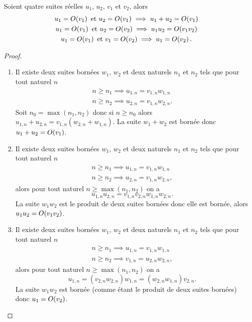 \begin{prop}
  Soient quatre suites réelles \(u_1\), \(u_2\), \(v_1\) et \(v_2\), alors
  \begin{gather}
  u_1 = O\mathopen{}\left(v_1\right) \text{~et~} u_2 = O\mathopen{}\left(v_1\right) \implies u_1+u_2 = O\mathopen{}\left(v_1\right)\\
  u_1 = O\mathopen{}\left(v_1\right) \text{~et~} u_2 = O\mathopen{}\left(v_2\right) \implies u_1u_2 = O\mathopen{}\left(v_1 v_2\right)\\
  u_1 = O\mathopen{}\left(v_1\right) \text{~et~} v_1 = O\mathopen{}\left(v_2\right) \implies u_1 = O\mathopen{}\left(v_2\right).
  \end{gather}
\end{prop}
\begin{proof}
  \begin{enumerate}
  \item Il existe deux suites bornées \(w_1\), \(w_2\) et deux naturels \(n_1\) et \(n_2\) tels que pour tout naturel \(n\)
    \begin{align}
      n \geqslant n_1 \implies u_{1,n} = v_{1,n}w_{1,n} \\
      n \geqslant n_2 \implies u_{2,n} = v_{1,n}w_{2,n}.
    \end{align}
    Soit \(n_0 = \max(n_1,n_2)\) donc si \(n \geqslant n_0\) alors \(u_{1,n} + u_{2,n}= v_{1,n} (w_{2,n}+w_{1,n})\). La suite \(w_{1} + w_{2}\) est bornée donc \(u_1+u_2 = O\mathopen{}\left(v_1\right)\).
  \item Il existe deux suites bornées \(w_1\), \(w_2\) et deux naturels \(n_1\) et \(n_2\) tels que pour tout naturel \(n\)
    \begin{align}
      n \geqslant n_1 \implies u_{1,n} = v_{1,n}w_{1,n} \\
      n \geqslant n_2 \implies u_{2,n} = v_{1,n}w_{2,n},
    \end{align}
    alors pour tout naturel \(n \geqslant \max(n_1,n_2)\) on a
    \begin{equation}
      u_{1,n} u_{2,n} = v_{1,n} v_{2,n} w_{1,n} w_{2,n}.
    \end{equation}
    La suite \(w_1 w_2\) est le produit de deux suites bornées donc elle est bornée, alors \(u_1u_2 = O\mathopen{}\left(v_1v_2\right)\).
  \item Il existe deux suites bornées \(w_1\), \(w_2\) et deux naturels \(n_1\) et \(n_2\) tels que pour tout naturel \(n\) 
    \begin{align}
      n \geqslant n_1 \implies u_{1,n} = v_{1,n}w_{1,n} \\
      n \geqslant n_2 \implies v_{1,n} = u_{2,n}w_{2,n}, 
    \end{align}
    alors pour tout naturel \(n \geqslant \max(n_1,n_2)\) on a
    \begin{equation}
      u_{1,n} = (v_{2,n} w_{2,n})w_{1,n} = (w_{2,n} w_{1,n}) v_{2,n}.
    \end{equation}
    La suite \(w_1 w_2\) est bornée (comme étant le produit de deux suites bornées) donc \(u_1 = O\mathopen{}\left(v_2\right)\).
  \end{enumerate}
\end{proof}

